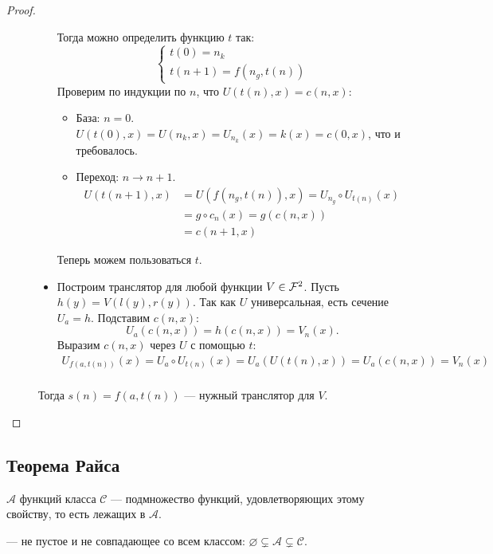 \begin{proof}
\begin{description}
\begin{proof*}
\begin{itemize}
						Тогда можно определить функцию $t$ так:
						 \[
						\begin{cases}
							t(0) = n_k \\
							t(n+1) = f(n_g, t(n))
						\end{cases}
						\] 
						Проверим по индукции по $ n$, что $U(t(n),x) = c(n,x)$:
						\begin{itemize}
							\item База:  $ n = 0$. $ U(t(0), x) = U(n_k, x) = U_{n_k}(x) = k(x) = c(0, x)$, что и требовалось.
							\item Переход: $ n \to n+1$.
								\begin{align*}
									U(t(n+1), x) & = U(f(n_g, t(n)), x) = U_{n_g} \circ U_{t(n)}(x) \tag{определение $ t$ и свойство  $ f$} \\
												 &= g \circ c_n(x) = g(c(n, x)) \tag{предположение индукции} \\
												 &= c(n+1, x)
								\end{align*}
						\end{itemize}
						Теперь можем пользоваться $ t$.
					\item Построим транслятор для любой функции $ V \in \mathcal{F}^2$.
						Пусть $ h(y) = V(l(y), r(y))$. Так как  $ U$ универсальная, есть сечение $ U_a = h$. Подставим  $ c(n, x)$:
						\[
							U_{a}(c(n, x)) = h(c(n, x)) = V_n(x)
						.\] 
						Выразим $ c(n, x)$ через $ U$ с помощью $ t$:
						\[
						\begin{aligned}
						 	U_{f(a, t(n))}(x) = U_a \circ U_{t(n)}(x) = U_{a}(U(t(n), x)) = U_{a}(c(n, x)) = V_n(x) \\
						\end{aligned}
					\]
				\end{itemize}
				Тогда $ s(n) = f(a, t(n))$ --- нужный транслятор для  $ V$.
			\end{proof*}
    \end{description} 
\end{proof}

\newpage
\subsection{Теорема Райса}
\begin{defn} 
	 $ \mathcal{A}$ функций класса $ \mathcal{C}$ --- подмножество функций, удовлетворяющих этому свойству, то есть лежащих в $ \mathcal{A}$.

	\noindent
	 --- не пустое и не совпадающее со всем классом: $ \varnothing \subsetneq \mathcal{A} \subsetneq \mathcal{C}$.
\end{defn}

